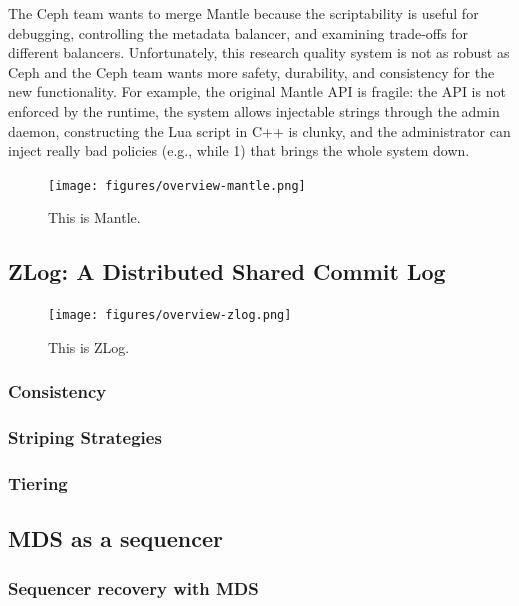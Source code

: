\documentclass[10pt,twocolumn]{article}
\begin{document}
The Ceph team wants to merge Mantle because the scriptability is useful
for debugging, controlling the metadata balancer, and examining
trade-offs for different balancers. Unfortunately, this research quality
system is not as robust as Ceph and the Ceph team wants more safety,
durability, and consistency for the new functionality. For example, the
original Mantle API is fragile: the API is not enforced by the runtime,
the system allows injectable strings through the admin daemon,
constructing the Lua script in C++ is clunky, and the administrator can
inject really bad policies (e.g., while 1) that brings the whole system
down.

\begin{figure}[htbp]
\centering
\texttt{[image: figures/overview-mantle.png]}
\caption{This is Mantle.}
\end{figure}

\subsection{ZLog: A Distributed Shared Commit
Log}\label{zlog-a-distributed-shared-commit-log}

\begin{figure}[htbp]
\centering
\texttt{[image: figures/overview-zlog.png]}
\caption{This is ZLog.}
\end{figure}

\subsubsection{Consistency}\label{consistency}

\subsubsection{Striping Strategies}\label{striping-strategies}

\subsubsection{Tiering}\label{tiering}

\subsection{MDS as a sequencer}\label{mds-as-a-sequencer}

\subsubsection{Sequencer recovery with
MDS}\label{sequencer-recovery-with-mds}
\end{document}

